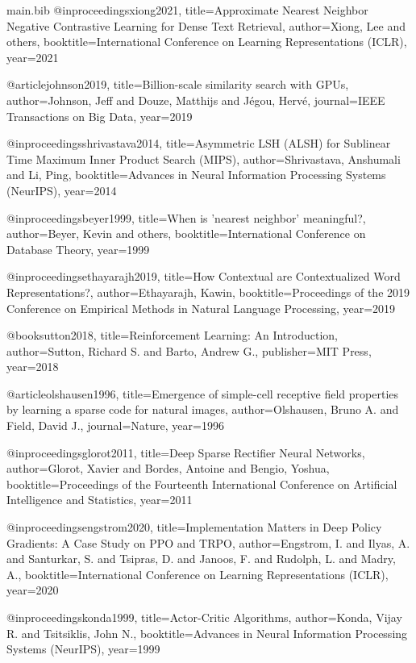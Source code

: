 \begin{filecontents*}{main.bib}
@inproceedings{xiong2021,
  title={Approximate Nearest Neighbor Negative Contrastive Learning for Dense Text Retrieval},
  author={Xiong, Lee and others},
  booktitle={International Conference on Learning Representations (ICLR)},
  year={2021}
}

@article{johnson2019,
  title={Billion-scale similarity search with GPUs},
  author={Johnson, Jeff and Douze, Matthijs and J{\'e}gou, Herv{\'e}},
  journal={IEEE Transactions on Big Data},
  year={2019}
}

@inproceedings{shrivastava2014,
  title={Asymmetric LSH (ALSH) for Sublinear Time Maximum Inner Product Search (MIPS)},
  author={Shrivastava, Anshumali and Li, Ping},
  booktitle={Advances in Neural Information Processing Systems (NeurIPS)},
  year={2014}
}

@inproceedings{beyer1999,
  title={When is 'nearest neighbor' meaningful?},
  author={Beyer, Kevin and others},
  booktitle={International Conference on Database Theory},
  year={1999}
}

@inproceedings{ethayarajh2019,
  title={How Contextual are Contextualized Word Representations?},
  author={Ethayarajh, Kawin},
  booktitle={Proceedings of the 2019 Conference on Empirical Methods in Natural Language Processing},
  year={2019}
}

@book{sutton2018,
  title={Reinforcement Learning: An Introduction},
  author={Sutton, Richard S. and Barto, Andrew G.},
  publisher={MIT Press},
  year={2018}
}

@article{olshausen1996,
  title={Emergence of simple-cell receptive field properties by learning a sparse code for natural images},
  author={Olshausen, Bruno A. and Field, David J.},
  journal={Nature},
  year={1996}
}

@inproceedings{glorot2011,
  title={Deep Sparse Rectifier Neural Networks},
  author={Glorot, Xavier and Bordes, Antoine and Bengio, Yoshua},
  booktitle={Proceedings of the Fourteenth International Conference on Artificial Intelligence and Statistics},
  year={2011}
}

@inproceedings{engstrom2020,
  title={Implementation Matters in Deep Policy Gradients: A Case Study on PPO and TRPO},
  author={Engstrom, I. and Ilyas, A. and Santurkar, S. and Tsipras, D. and Janoos, F. and Rudolph, L. and Madry, A.},
  booktitle={International Conference on Learning Representations (ICLR)},
  year={2020}
}

@inproceedings{konda1999,
  title={Actor-Critic Algorithms},
  author={Konda, Vijay R. and Tsitsiklis, John N.},
  booktitle={Advances in Neural Information Processing Systems (NeurIPS)},
  year={1999}
}


\end{filecontents*}
